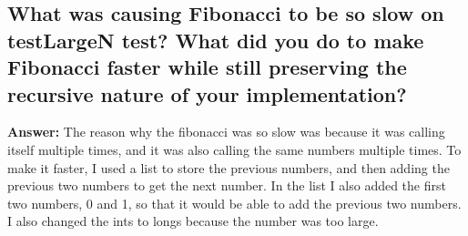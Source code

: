 \documentclass[11pt]{article}
\begin{document}
\subsection{What was causing Fibonacci to be so slow on testLargeN test? What did you do to make Fibonacci faster while still preserving the recursive nature of your implementation?}
\textbf{Answer:}
The reason why the fibonacci was so slow was because it was calling itself multiple times, and it was also calling the same numbers multiple times. To make it faster, I used a list to store the previous numbers, and then adding the previous two numbers to get the next number.
In the list I also added the first two numbers, 0 and 1, so that it would be able to add the previous two numbers. I also changed the ints to longs because the number was too large.
\end{document}
